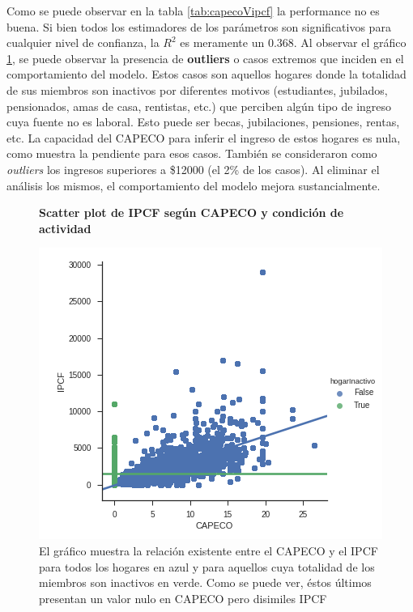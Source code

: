 Como se puede observar en la tabla \ref{tab:capecoVipcf} la performance no es buena. Si bien todos los estimadores de los parámetros son significativos para cualquier nivel de confianza, la $R^2$ es meramente un 0.368. Al observar el gráfico \ref{fig:capecoVipcf.png}, se puede observar la presencia de \textbf{outliers} o casos extremos que inciden en el comportamiento del modelo. Estos casos son aquellos hogares donde la totalidad de sus miembros son inactivos por diferentes motivos (estudiantes, jubilados, pensionados, amas de casa, rentistas, etc.) que perciben algún tipo de ingreso cuya fuente no es laboral. Esto puede ser becas, jubilaciones, pensiones, rentas, etc. La capacidad del CAPECO para inferir el ingreso de estos hogares es nula, como muestra la pendiente para esos casos. También se consideraron como \textit{outliers} los ingresos superiores a \$12000 (el 2\% de los casos). Al eliminar el análisis los mismos, el comportamiento del modelo mejora sustancialmente. 


     \begin{figure}[!htb]
     	\centering
     	\textbf{Scatter plot de IPCF según CAPECO y condición de actividad}\par\medskip
     	\includegraphics[scale = 0.4]{../img/capitulo3/capecoVipcf.png}
     	\caption{El gráfico muestra la relación existente entre el CAPECO y el IPCF para todos los hogares en azul y para aquellos cuya totalidad de los miembros son inactivos en verde. Como se puede ver, éstos últimos presentan un valor nulo en CAPECO pero disimiles IPCF}
     	\label{fig:capecoVipcf.png}
     \end{figure}
     
